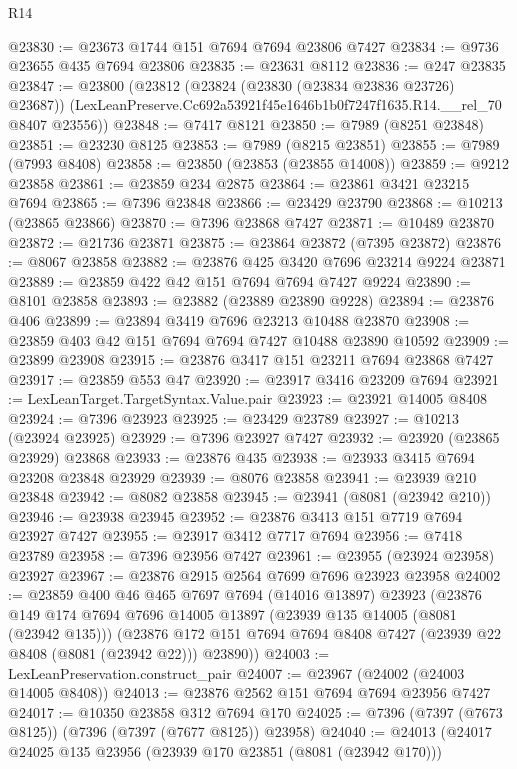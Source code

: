 \begin{lexlean}{R14}
\begin{coremodule}
@23830 := @23673 @1744 @151 @7694 @7694 @23806 @7427
@23834 := @9736 @23655 @435 @7694 @23806
@23835 := @23631 @8112
@23836 := @247 @23835
@23847 := @23800
    (@23812
      (@23824 (@23830 (@23834 @23836 @23726) @23687))
      (LexLeanPreserve.Cc692a53921f45e1646b1b0f7247f1635.R14.__rel_70 @8407 @23556))
@23848 := @7417 @8121
@23850 := @7989 (@8251 @23848)
@23851 := @23230 @8125
@23853 := @7989 (@8215 @23851)
@23855 := @7989 (@7993 @8408)
@23858 := @23850 (@23853 (@23855 @14008))
@23859 := @9212 @23858
@23861 := @23859 @234 @2875
@23864 := @23861 @3421 @23215 @7694
@23865 := @7396 @23848
@23866 := @23429 @23790
@23868 := @10213 (@23865 @23866)
@23870 := @7396 @23868 @7427
@23871 := @10489 @23870
@23872 := @21736 @23871
@23875 := @23864 @23872 (@7395 @23872)
@23876 := @8067 @23858
@23882 := @23876 @425 @3420 @7696 @23214 @9224 @23871
@23889 := @23859 @422 @42 @151 @7694 @7694 @7427 @9224
@23890 := @8101 @23858
@23893 := @23882 (@23889 @23890 @9228)
@23894 := @23876 @406
@23899 := @23894 @3419 @7696 @23213 @10488 @23870
@23908 := @23859 @403 @42 @151 @7694 @7694 @7427 @10488 @23890 @10592
@23909 := @23899 @23908
@23915 := @23876 @3417 @151 @23211 @7694 @23868 @7427
@23917 := @23859 @553 @47
@23920 := @23917 @3416 @23209 @7694
@23921 := LexLeanTarget.TargetSyntax.Value.pair
@23923 := @23921 @14005 @8408
@23924 := @7396 @23923
@23925 := @23429 @23789
@23927 := @10213 (@23924 @23925)
@23929 := @7396 @23927 @7427
@23932 := @23920 (@23865 @23929) @23868
@23933 := @23876 @435
@23938 := @23933 @3415 @7694 @23208 @23848 @23929
@23939 := @8076 @23858
@23941 := @23939 @210 @23848
@23942 := @8082 @23858
@23945 := @23941 (@8081 (@23942 @210))
@23946 := @23938 @23945
@23952 := @23876 @3413 @151 @7719 @7694 @23927 @7427
@23955 := @23917 @3412 @7717 @7694
@23956 := @7418 @23789
@23958 := @7396 @23956 @7427
@23961 := @23955 (@23924 @23958) @23927
@23967 := @23876 @2915 @2564 @7699 @7696 @23923 @23958
@24002 := @23859
    @400
    @46
    @465
    @7697
    @7694
    (@14016 @13897)
    @23923
    (@23876
      @149
      @174
      @7694
      @7696
      @14005
      @13897
      (@23939 @135 @14005 (@8081 (@23942 @135)))
      (@23876 @172 @151 @7694 @7694 @8408 @7427 (@23939 @22 @8408 (@8081 (@23942 @22))) @23890))
@24003 := LexLeanPreservation.construct_pair
@24007 := @23967 (@24002 (@24003 @14005 @8408))
@24013 := @23876 @2562 @151 @7694 @7694 @23956 @7427
@24017 := @10350 @23858 @312 @7694 @170
@24025 := @7396 (@7397 (@7673 @8125)) (@7396 (@7397 (@7677 @8125)) @23958)
@24040 := @24013
    (@24017
      @24025
      @135
      @23956
      (@23939 @170 @23851 (@8081 (@23942 @170)))

\end{coremodule}
\end{lexlean}
